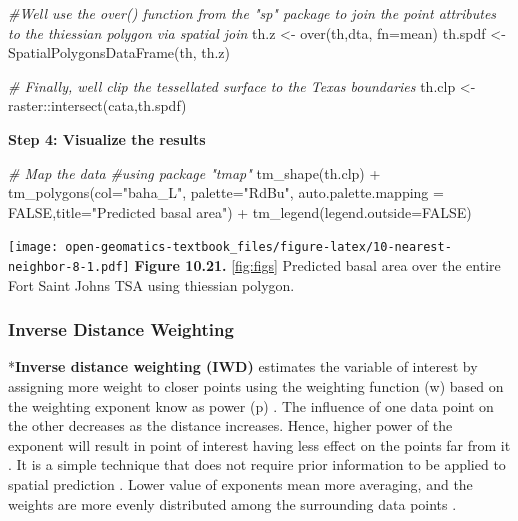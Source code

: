 \documentclass[
]{book}
\newenvironment{Shaded}{\begin{snugshade}}{\end{snugshade}}
\newcommand{\AttributeTok}[1]{\textcolor[rgb]{0.77,0.63,0.00}{#1}}
\newcommand{\CommentTok}[1]{\textcolor[rgb]{0.56,0.35,0.01}{\textit{#1}}}
\newcommand{\ConstantTok}[1]{\textcolor[rgb]{0.00,0.00,0.00}{#1}}
\newcommand{\FunctionTok}[1]{\textcolor[rgb]{0.00,0.00,0.00}{#1}}
\newcommand{\NormalTok}[1]{#1}
\newcommand{\OtherTok}[1]{\textcolor[rgb]{0.56,0.35,0.01}{#1}}
\newcommand{\SpecialCharTok}[1]{\textcolor[rgb]{0.00,0.00,0.00}{#1}}
\newcommand{\StringTok}[1]{\textcolor[rgb]{0.31,0.60,0.02}{#1}}
\begin{document}
\begin{Shaded}
\begin{Highlighting}[]
\CommentTok{\#We\textquotesingle{}ll use the over() function from the "sp" package to join the point attributes to the thiessian polygon via spatial join}
\NormalTok{th.z     }\OtherTok{\textless{}{-}} \FunctionTok{over}\NormalTok{(th,dta, }\AttributeTok{fn=}\NormalTok{mean)}
\NormalTok{th.spdf  }\OtherTok{\textless{}{-}}  \FunctionTok{SpatialPolygonsDataFrame}\NormalTok{(th, th.z)}

\CommentTok{\# Finally, we\textquotesingle{}ll clip the tessellated  surface to the Texas boundaries}
\NormalTok{th.clp   }\OtherTok{\textless{}{-}}\NormalTok{ raster}\SpecialCharTok{::}\FunctionTok{intersect}\NormalTok{(cata,th.spdf)}
\end{Highlighting}
\end{Shaded}

\textbf{Step 4: Visualize the results}

\begin{Shaded}
\begin{Highlighting}[]
\CommentTok{\# Map the data}
\CommentTok{\#using package "tmap"}
\FunctionTok{tm\_shape}\NormalTok{(th.clp) }\SpecialCharTok{+}
  \FunctionTok{tm\_polygons}\NormalTok{(}\AttributeTok{col=}\StringTok{"baha\_L"}\NormalTok{, }\AttributeTok{palette=}\StringTok{"RdBu"}\NormalTok{, }\AttributeTok{auto.palette.mapping =} \ConstantTok{FALSE}\NormalTok{,}\AttributeTok{title=}\StringTok{"Predicted basal area"}\NormalTok{) }\SpecialCharTok{+}
  \FunctionTok{tm\_legend}\NormalTok{(}\AttributeTok{legend.outside=}\ConstantTok{FALSE}\NormalTok{)}
\end{Highlighting}
\end{Shaded}

\texttt{[image: open-geomatics-textbook\_files/figure-latex/10-nearest-neighbor-8-1.pdf]}
\textbf{Figure 10.21.} \ref{fig:figs} Predicted basal area over the entire Fort Saint Johns TSA using thiessian polygon.

\hypertarget{inverse-distance-weighting}{%
\subsubsection{Inverse Distance Weighting}\label{inverse-distance-weighting}}

*\textbf{Inverse distance weighting (IWD)} \citep{Shepard1968} estimates the variable of interest by assigning more weight to closer points using the weighting function (w) based on the weighting exponent know as power (p) \citep{Babak2009}. The influence of one data point on the other decreases as the distance increases. Hence, higher power of the exponent will result in point of interest having less effect on the points far from it \citep{Babak2009}. It is a simple technique that does not require prior information to be applied to spatial prediction \citep{Shepard1968}. Lower value of exponents mean more averaging, and the weights are more evenly distributed among the surrounding data points \citep{Shepard1968}.
\end{document}
